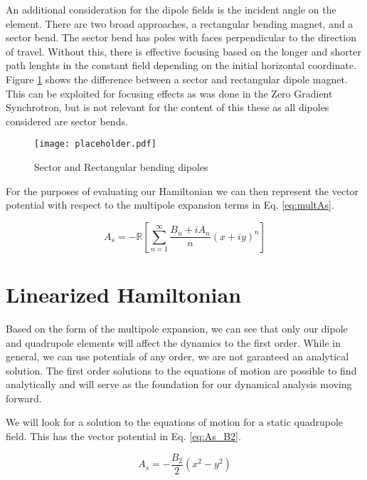 An additional consideration for the dipole fields is the incident angle on the element. There are two broad approaches, a rectangular bending magnet, and a sector bend. The sector bend has poles with faces perpendicular to the direction of travel. Without this, there is effective focusing based on the longer and shorter path lenghts in the constant field depending on the initial horizontal coordinate. Figure \ref{fig:sector} shows the difference between a sector and rectangular dipole magnet. This can be exploited for focusing effects as was done in the Zero Gradient Synchrotron, but is not relevant for the content of this these as all dipoles considered are sector bends.

\begin{figure} \label{fig:sector}
	\centering
	\texttt{[image: placeholder.pdf]}
	\caption{Sector and Rectangular bending dipoles}
\end{figure}


For the purposes of evaluating our Hamiltonian we can then represent the vector potential with respect to the multipole expansion terms in Eq. \ref{eq:multAs}.

\begin{equation} \label{eq:multAs}
	A_s  =  - \mathbb{R} \left[ \sum_{n=1}^{\infty} \frac{B_n + i A_n}{n} (x+iy)^n \right]
\end{equation}


\section{Linearized Hamiltonian} \label{sec:linHam}
Based on the form of the multipole expansion, we can see that only our dipole and quadrupole elements will affect the dynamics to the first order. While in general, we can use potentials of any order, we are not garanteed an analytical solution. The first order solutions to the equations of motion are possible to find analytically and will serve as the foundation for our dynamical analysis moving forward.

We will look for a solution to the equations of motion for a static quadrupole field. This has the vector potential in Eq. \ref{eq:As_B2}.

\begin{equation} \label{eq:As_B2}
	A_s = -\frac{B_2}{2}(x^2 - y^2)
\end{equation}

